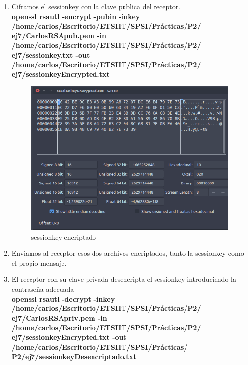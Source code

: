 \begin{enumerate}
	\item Ciframos el sessionkey con la clave publica del receptor. \\
	\textbf{openssl rsautl -encrypt -pubin -inkey\\ /home/carlos/Escritorio/ETSIIT/SPSI/Prácticas/P2/\\ej7/CarlosRSApub.pem -in /home/carlos/Escritorio/ETSIIT/SPSI/Prácticas/P2/\\ej7/sessionkey.txt -out /home/carlos/Escritorio/ETSIIT/SPSI/Prácticas/P2/\\ej7/sessionkeyEncrypted.txt}
	
	\begin{figure}[H] %
		\centering
		\includegraphics[scale=0.55]{imagenes/sessionkeyEncryptedE7} 
		\caption{sessionkey encriptado} \label{etiq}
	\end{figure}
	
	\item Enviamos al receptor esos dos archivos encriptados, tanto la sessionkey como el propio mensaje.
	
	\item El receptor con su clave privada desencripta el sessionkey introduciendo la contraseña adecuada \\
	\textbf{	openssl rsautl -decrypt -inkey \\ /home/carlos/Escritorio/ETSIIT/SPSI/Prácticas/P2/\\ej7/CarlosRSApriv.pem -in /home/carlos/Escritorio/ETSIIT/SPSI/Prácticas/P2/\\ej7/sessionkeyEncrypted.txt -out /home/carlos/Escritorio/ETSIIT/SPSI/Prácticas/\\P2/ej7/sessionkeyDesencriptado.txt}
	

\end{enumerate}
